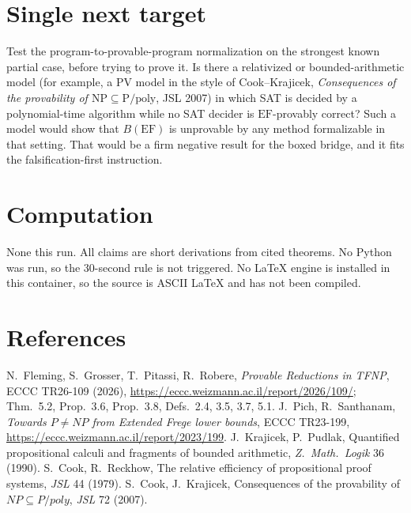 \documentclass[11pt]{article}
\theoremstyle{definition}
\theoremstyle{remark}
\newcommand{\EF}{\mathrm{EF}}
\begin{document}
\section{Single next target}
Test the program-to-provable-program normalization on the strongest known partial case, before trying to prove it.
Is there a relativized or bounded-arithmetic model (for example, a $\mathrm{PV}$ model in the style of
Cook--Krajicek, \emph{Consequences of the provability of $\mathrm{NP}\subseteq\mathrm{P/poly}$}, JSL 2007)
in which SAT is decided by a polynomial-time algorithm while no SAT decider is $\EF$-provably correct?
Such a model would show that $B(\EF)$ is unprovable by any method formalizable in that setting.
That would be a firm negative result for the boxed bridge, and it fits the falsification-first instruction.

\section*{Computation}
None this run. All claims are short derivations from cited theorems. No Python was run, so the 30-second rule is not triggered.
No LaTeX engine is installed in this container, so the source is ASCII LaTeX and has not been compiled.

\section*{References}
N.~Fleming, S.~Grosser, T.~Pitassi, R.~Robere, \emph{Provable Reductions in TFNP}, ECCC TR26-109 (2026),
\url{https://eccc.weizmann.ac.il/report/2026/109/}; Thm.~5.2, Prop.~3.6, Prop.~3.8, Defs.~2.4, 3.5, 3.7, 5.1.
J.~Pich, R.~Santhanam, \emph{Towards $P\neq NP$ from Extended Frege lower bounds}, ECCC TR23-199,
\url{https://eccc.weizmann.ac.il/report/2023/199}.
J.~Krajicek, P.~Pudlak, Quantified propositional calculi and fragments of bounded arithmetic, \emph{Z.~Math.~Logik} 36 (1990).
S.~Cook, R.~Reckhow, The relative efficiency of propositional proof systems, \emph{JSL} 44 (1979).
S.~Cook, J.~Krajicek, Consequences of the provability of $NP\subseteq P/poly$, \emph{JSL} 72 (2007).
\end{document}
